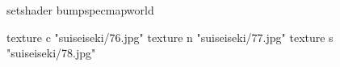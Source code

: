 setshader bumpspecmapworld

    texture c "suiseiseki/76.jpg"
    texture n "suiseiseki/77.jpg"
    texture s "suiseiseki/78.jpg"
